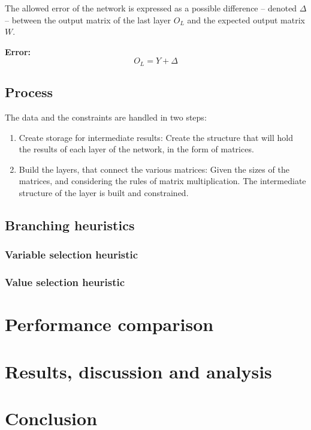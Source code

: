 \documentclass[a4paper, 10pt]{article}
\begin{document}
The allowed error of the network is expressed as a possible difference --
denoted $\Delta$ -- between the output matrix of the last layer $O_L$
and the expected output matrix $W$.
\begin{description}

        \item{\textbf{Error:}}
            \begin{equation*}
                O_L = Y + \Delta
            \end{equation*}
\end{description}

\subsection*{Process}

The data and the constraints are handled in two steps:
\begin{enumerate}
    \item{Create storage for intermediate results}: 
        Create the structure that will hold the results of each layer of the
        network, in the form of matrices.

    \item{Build the layers, that connect the various matrices}:
        Given the sizes of the matrices, and considering the rules of matrix
        multiplication. The intermediate structure of the layer is built and
        constrained.
\end{enumerate}

\subsection*{Branching heuristics}

\subsubsection*{Variable selection heuristic}

\subsubsection*{Value selection heuristic}

\section{Performance comparison}

\section{Results, discussion and analysis}

\section{Conclusion}



\end{document}
